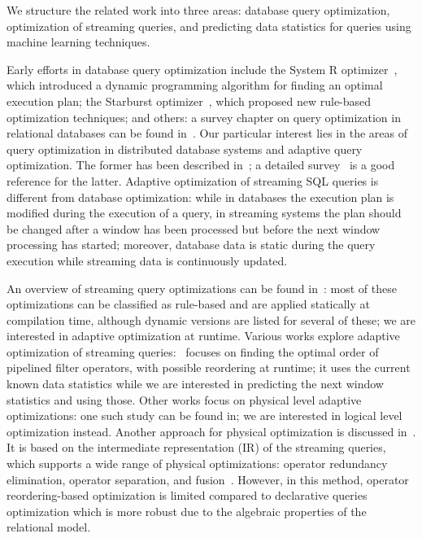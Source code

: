 \label {sec:fs-optimization-related-work}

We structure the related work into three areas: database query optimization, optimization of streaming queries, and predicting data statistics for queries using machine learning techniques.

Early efforts in database query optimization include the System R optimizer~\cite{selinger1979access}, which introduced a dynamic programming algorithm for finding an optimal execution plan; the Starburst optimizer~\cite{haas1989extensible}, which proposed new rule-based optimization techniques; and others: a survey chapter on query optimization in relational databases can be found in~\cite{Neumann2018optimization}. Our particular interest lies in the areas of query optimization in distributed database systems and adaptive query optimization. The former has been described in~\cite{kossmann2000thestate}; a detailed survey~\cite{deshpande2007adaptive} is a good reference for the latter. Adaptive optimization of streaming SQL queries is different from database optimization: while in databases the execution plan is modified during the execution of a query, in streaming systems the plan should be changed after a window has been processed but before the next window processing has started; moreover, database data is static during the query execution while streaming data is continuously updated.

An overview of streaming query optimizations can be found in~\cite{hirzel2014catalog}: most of these optimizations can be classified as rule-based and are applied statically at compilation time, although dynamic versions are listed for several of these; we are interested in adaptive optimization at runtime. Various works explore adaptive optimization of streaming queries:~\cite{babu2004adaptive} focuses on finding the optimal order of pipelined filter operators, with possible reordering at runtime; it uses the current known data statistics while we are interested in predicting the next window statistics and using those. Other works focus on physical level adaptive optimizations: one such study can be found in\cite{grulich2020grizzly}; we are interested in logical level optimization instead. Another approach for physical optimization is discussed in~\cite{kroll2019arc}. It is based on the intermediate representation (IR) of the streaming queries, which supports a wide range of physical optimizations: operator redundancy elimination, operator separation, and fusion~\cite{hirzel2014catalog}. However, in this method, operator reordering-based optimization is limited compared to declarative queries optimization which is more robust due to the algebraic properties of the relational model. 

